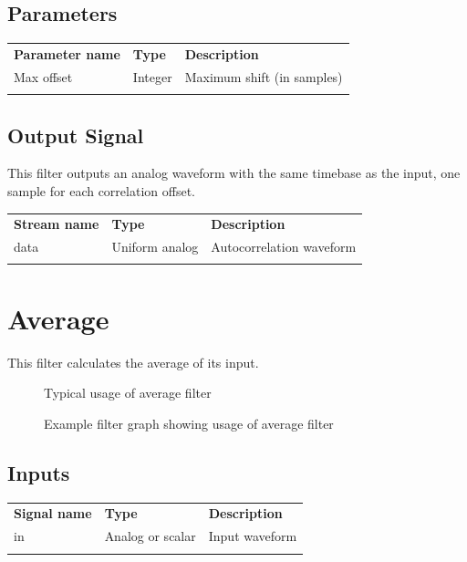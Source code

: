 \subsection{Parameters}

\begin{tabularx}{16cm}{llX}
\thickhline
\textbf{Parameter name} & \textbf{Type} & \textbf{Description} \\
\thickhline
Max offset & Integer & Maximum shift (in samples)\\
\thickhline
\end{tabularx}

\subsection{Output Signal}

This filter outputs an analog waveform with the same timebase as the input, one sample for each correlation offset.

\begin{tabularx}{16cm}{llX}
\thickhline
\textbf{Stream name} & \textbf{Type} & \textbf{Description} \\
\thickhline
data & Uniform analog & Autocorrelation waveform \\
\thickhline
\end{tabularx}

\pagebreak
\section{Average}
\label{filter:average}

This filter calculates the average of its input.

\begin{figure}[h]
\centering
{}
\caption{Typical usage of average filter}
\label{filter_average}
\end{figure}

\begin{figure}[h]
\centering
{}
\caption{Example filter graph showing usage of average filter}
\label{filter_graph_average}
\end{figure}
\FloatBarrier

\subsection{Inputs}
\begin{tabularx}{16cm}{llX}
\thickhline
\textbf{Signal name} & \textbf{Type} & \textbf{Description} \\
\thickhline
in & Analog or scalar & Input waveform \\
\thickhline
\end{tabularx}


